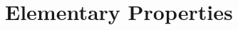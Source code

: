 \chapter{Elementary Properties}
    \ifcsname\PATH\endcsname
        \newcommand{\PATH}{books/Algebra/Modules/Elementary_Properties}
    \else
        \renewcommand{\PATH}{books/Algebra/Modules/Elementary_Properties}
    \fi

    